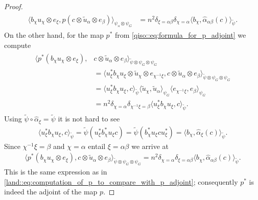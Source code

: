 \documentclass{amsart}
\theoremstyle{definition}
\theoremstyle{definition}
\begin{document}
\begin{proof}
\begin{align}
        \begin{aligned}
            \langle b_\chi u_\chi \otimes e_\xi, p(c \otimes \tilde{u}_\alpha \otimes e_\beta) \rangle_{\psi_{\rtimes} \otimes \psi_G}
            &= n^2 \delta_{\xi=\alpha\beta} \delta_{\chi=\alpha} \langle b_\chi, \hat{\alpha}_{\alpha\beta}(c) \rangle_{\tilde{\psi}}.
        \end{aligned}
    \end{align}
    On the other hand, for the map $p^\ast$ from \eqref{qiso::eq:formula_for_p_adjoint} we compute
    \begin{align*}
        \begin{aligned}
        \langle p^\ast(b_\chi u_\chi \otimes e_\xi), &c \otimes \tilde{u}_\alpha \otimes e_\beta \rangle_{\tilde{\psi} \otimes \psi_G \otimes \psi_G} \\
            &= \langle u_\xi^\ast b_\chi u_\xi \otimes \tilde{u}_\chi \otimes e_{\chi^{-1}\xi}, c \otimes \tilde{u}_\alpha \otimes e_\beta \rangle_{\tilde{\psi} \otimes \psi_G \otimes \psi_G} \\
            &= \langle u_\xi^\ast b_\chi u_\xi, c \rangle_{\tilde{\psi}} \langle \tilde{u}_\chi, \tilde{u}_\alpha \rangle_{\psi_G} \langle e_{\chi^{-1}\xi}, e_\beta \rangle_{\psi_G} \\
            &= n^2 \delta_{\chi=\alpha} \delta_{\chi^{-1} \xi = \beta} \langle u_\xi^\ast b_\chi u_\xi, c \rangle_{\tilde{\psi}}.
        \end{aligned}
    \end{align*}
    Using $\tilde{\psi} \circ \hat{\alpha}_\xi = \tilde{\psi}$ it is not hard to see
    \begin{align*}
        \langle u_\xi^\ast b_\chi u_\xi, c \rangle_{\tilde{\psi}} 
            = \tilde{\psi}(u_\xi^\ast b_\chi^\ast u_\xi c)
            = \tilde{\psi}(b_\chi^\ast u_\xi c u_\xi^\ast)
            = \langle b_\chi, \hat{\alpha}_\xi(c) \rangle_{\tilde{\psi}}.
    \end{align*}
    Since $\chi^{-1} \xi = \beta$ and $\chi=\alpha$ entail $\xi = \alpha \beta$ we arrive at
    \begin{align}
        \langle p^\ast(b_\chi u_\chi \otimes e_\xi), c \otimes \tilde{u}_\alpha \otimes e_\beta \rangle_{\tilde{\psi} \otimes \psi_G \otimes \psi_G}
            = n^2 \delta_{\chi=\alpha} \delta_{\xi = \alpha \beta} \langle b_\chi, \hat{\alpha}_{\alpha \beta}(c) \rangle_{\tilde{\psi}}.
    \end{align}
    This is the same expression as in \eqref{land::eq:computation_of_p_to_compare_with_p_adjoint}; consequently $p^\ast$ is indeed the adjoint of the map $p$.


\end{proof}
\end{document}
